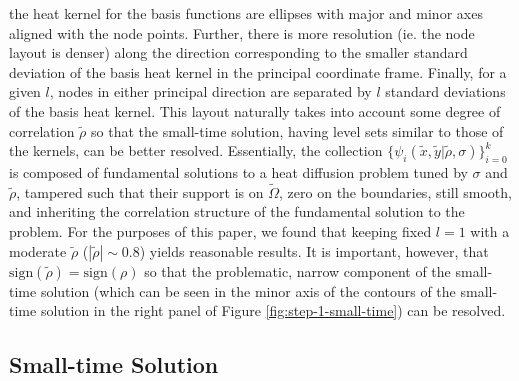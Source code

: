 the heat kernel for the basis functions are ellipses with major and
minor axes aligned with the node points. Further, there is more
resolution (ie. the node layout is denser) along the direction
corresponding to the smaller standard deviation of the basis heat
kernel in the principal coordinate frame. Finally, for a given $l$,
nodes in either principal direction are separated by $l$ standard
deviations of the basis heat kernel. This layout naturally takes into
account some degree of correlation $\tilde{\rho}$ so that the
small-time solution, having level sets similar to those of the
kernels, can be better resolved. Essentially, the collection
$\{ \psi_i(\tilde{x},\tilde{y}| \tilde{\rho}, \sigma) \}_{i=0}^k$ is
composed of fundamental solutions to a heat diffusion problem tuned by
$\sigma$ and $\tilde{\rho}$, tampered such that their support is on
$\tilde{\Omega}$, zero on the boundaries, still smooth, and inheriting
the correlation structure of the fundamental solution to the
problem. For the purposes of this paper, we found that keeping
fixed $l=1$ with a moderate $\tilde{\rho}$ ($|\tilde{\rho}| \sim 0.8$)
yields reasonable results. It is important, however, that
$\mbox{sign}(\tilde{\rho}) = \mbox{sign}(\rho)$ so that the
problematic, narrow component of the small-time solution (which can be
seen in the minor axis of the contours of the small-time solution in
the right panel of Figure \ref{fig:step-1-small-time}) can be
resolved.
%
%
%


\subsection{Small-time Solution} \label{sec:pde-small-t}

